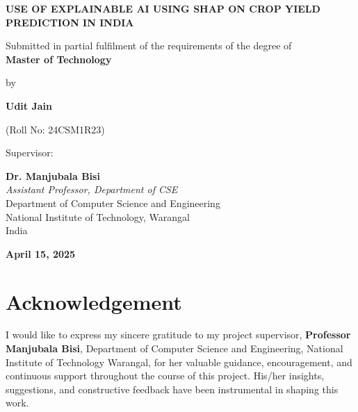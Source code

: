 \documentclass[a4paper,11pt,oneside]{book}
\begin{document}
\begin{titlepage}
    \centering
    \vspace*{2cm}
    {\Large\bfseries\uppercase{Use of Explainable AI using SHAP on Crop Yield Prediction in India} \par}
    \vspace{1cm}
    {\large Submitted in partial fulfilment of the requirements of the degree of\\[0.3cm]
    \textbf{Master of Technology} \par}
    \vspace{2.5cm}
    
    {\large by \par}
    \vspace{0.5cm}
    {\LARGE \textbf{Udit Jain} \par}
    {\Large (Roll No: 24CSM1R23) \par}
    \vspace{2.5cm}
    
    {\large Supervisor:\par}
    \vspace{0.3cm}
    \textbf{Dr. Manjubala Bisi} \\
    \textit{Assistant Professor, Department of CSE} \\[0.5cm]
    
    \vfill
    {\large Department of Computer Science and Engineering\\
    National Institute of Technology, Warangal\\
    India\\}
    \vspace{0.5cm}
    
    {\large \textbf{April 15, 2025} \par}
\end{titlepage}

\chapter*{Acknowledgement}
\vspace{1em}
I would like to express my sincere gratitude to my project supervisor, \textbf{Professor Manjubala Bisi}, Department of Computer Science and Engineering, National Institute of Technology Warangal, for her valuable guidance, encouragement, and continuous support throughout the course of this project. His/her insights, suggestions, and constructive feedback have been instrumental in shaping this work.
\end{document}
